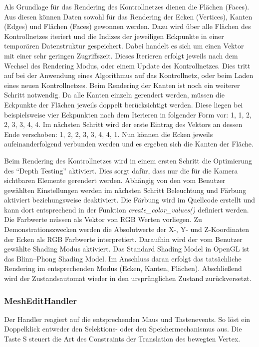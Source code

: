 Als Grundlage für das Rendering des Kontrollnetzes dienen die Flächen (Faces). Aus diesen können Daten sowohl für das Rendering der Ecken (Vertices), Kanten (Edges) und Flächen (Faces) gewonnen werden. Dazu wird über alle Flächen des Kontrollnetzes iteriert und die Indizes der jeweiligen Eckpunkte in einer temporären Datenstruktur gespeichert. Dabei handelt es sich um einen Vektor mit einer sehr geringen Zugriffszeit. Dieses Iterieren erfolgt jeweils nach dem Wechsel des Rendering Modus, oder einem Update des Kontrollnetzes. Dies tritt auf bei der Anwendung eines Algorithmus auf das Kontrollnetz, oder beim Laden eines neuen Kontrollnetzes. Beim Rendering der Kanten ist noch ein weiterer Schritt notwendig. Da alle Kanten einzeln gerendert werden, müssen die Eckpunkte der Flächen jeweils doppelt berücksichtigt werden. Diese liegen bei beispielsweise vier Eckpunkten nach dem Iterieren in folgender Form vor: 1, 1, 2, 2, 3, 3, 4, 4. Im nächsten Schritt wird der erste Eintrag des Vektors an dessen Ende verschoben: 1, 2, 2, 3, 3, 4, 4, 1. Nun können die Ecken jeweils aufeinanderfolgend verbunden werden und es ergeben sich die Kanten der Fläche.

Beim Rendering des Kontrollnetzes wird in einem ersten Schritt die Optimierung des \enquote{Depth Testing} aktiviert. Dies sorgt dafür, dass nur die für die Kamera sichtbaren Elemente gerendert werden. Abhängig von den vom Benutzer gewählten Einstellungen werden im nächsten Schritt Beleuchtung und Färbung aktiviert beziehungsweise deaktiviert. Die Färbung wird im Quellcode erstellt und kann dort entsprechend in der Funktion \textit{create\_color\_values()} definiert werden. Die Farbwerte müssen als Vektor von RGB Werten vorliegen. Zu Demonstrationszwecken werden die Absolutwerte der X-, Y- und Z-Koordinaten der Ecken als RGB Farbwerte interpretiert. Daraufhin wird der vom Benutzer gewählte Shading Modus aktiviert. Das Standard Shading Model in OpenGL ist das Blinn–Phong Shading Model. Im Anschluss daran erfolgt das tatsächliche Rendering im entsprechenden Modus (Ecken, Kanten, Flächen). Abschließend wird der Zustandsautomat wieder in den ursprünglichen Zustand zurückversetzt.

\subsubsection{MeshEditHandler}

Der Handler reagiert auf die entsprechenden Maus und Tastenevents.
So löst ein Doppelklick entweder den Selektions- oder den Speichermechanismus aus.
Die Taste S steuert die Art des Constraints der Translation des bewegten Vertex.


